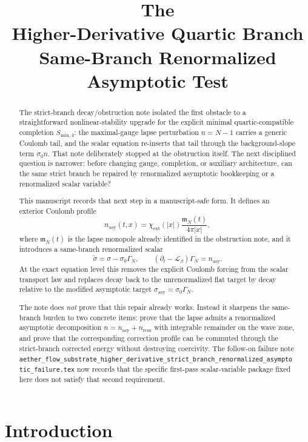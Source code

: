 \documentclass[11pt]{article}
\title{\textbf{The \TheoryName{}}\\[0.4em]
\large Higher-Derivative Quartic Branch Same-Branch Renormalized Asymptotic Test}
\author{}
\date{}
\newcommand{\Ell}{\mathcal{L}}
\begin{document}
\maketitle

\begin{abstract}
The strict-branch decay/obstruction note isolated the first obstacle to a straightforward nonlinear-stability upgrade for the explicit minimal quartic-compatible completion \(S_{\mathrm{min},4}\): the maximal-gauge lapse perturbation \(n=N-1\) carries a generic Coulomb tail, and the scalar equation re-inserts that tail through the background-slope term \(\sigma_0 n\). That note deliberately stopped at the obstruction itself. The next disciplined question is narrower: before changing gauge, completion, or auxiliary architecture, can the same strict branch be repaired by renormalized asymptotic bookkeeping or a renormalized scalar variable?

This manuscript records that next step in a manuscript-safe form. It defines an exterior Coulomb profile
\[
n_{\mathrm{asy}}(t,x)=\chi_{\mathrm{ext}}(|x|)\frac{\mathfrak m_N(t)}{4\pi|x|},
\]
where \(\mathfrak m_N(t)\) is the lapse monopole already identified in the obstruction note, and it introduces a same-branch renormalized scalar
\[
\widetilde{\sigma}=\sigma-\sigma_0\Gamma_N,
\qquad
(\partial_t-\Ell_\beta)\Gamma_N=n_{\mathrm{asy}}.
\]
At the exact equation level this removes the explicit Coulomb forcing from the scalar transport law and replaces decay back to the unrenormalized flat target by decay relative to the modified asymptotic target \(\sigma_{\mathrm{asy}}=\sigma_0\Gamma_N\).

The note does \emph{not} prove that this repair already works. Instead it sharpens the same-branch burden to two concrete items: prove that the lapse admits a renormalized asymptotic decomposition \(n=n_{\mathrm{asy}}+n_{\mathrm{rem}}\) with integrable remainder on the wave zone, and prove that the corresponding correction profile can be commuted through the strict-branch corrected energy without destroying coercivity. The follow-on failure note \texttt{aether\_flow\_substrate\_higher\_derivative\_strict\_branch\_renormalized\_asymptotic\_failure.tex} now records that the specific first-pass scalar-variable package fixed here does not satisfy that second requirement.
\end{abstract}

\section{Introduction}
\end{document}

